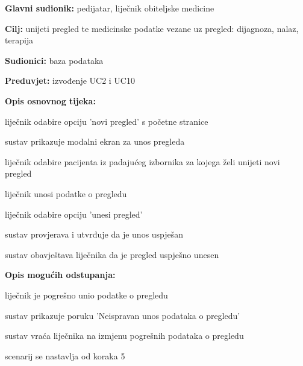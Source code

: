                     \noindent {}
					\begin{packed_item}
	
						\item \textbf{Glavni sudionik: }pedijatar, liječnik obiteljske medicine
						\item  \textbf{Cilj:} unijeti pregled te medicinske podatke vezane uz pregled: dijagnoza, nalaz, terapija
						\item  \textbf{Sudionici:} baza podataka
						\item  \textbf{Preduvjet:} izvođenje UC2 i UC10
						\item  \textbf{Opis osnovnog tijeka:}
						
						\item[] \begin{packed_enum}
	
							\item liječnik odabire opciju 'novi pregled' s početne stranice
							\item sustav prikazuje modalni ekran za unos pregleda
							\item liječnik odabire pacijenta iz padajućeg izbornika za kojega želi unijeti novi pregled
							\item liječnik unosi podatke o pregledu
							\item liječnik odabire opciju 'unesi pregled'
							\item sustav provjerava i utvrđuje da je unos uspješan
							\item sustav obavještava liječnika da je pregled uspješno unesen

						\end{packed_enum}

						\item  \textbf{Opis mogućih odstupanja:}
						
						\item[] \begin{packed_item}
	
							\item[6.a] liječnik je pogrešno unio podatke o pregledu
							\item[] \begin{packed_enum}
								
								\item sustav prikazuje poruku 'Neispravan unos podataka o pregledu'
								\item sustav vraća liječnika na izmjenu pogrešnih podataka o pregledu
								\item scenarij se nastavlja od koraka 5
							\end{packed_enum}
							
						\end{packed_item}
						
					\end{packed_item}

